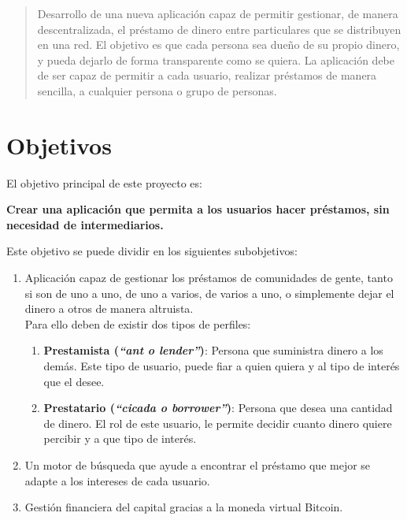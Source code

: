 \documentclass[10pt]{article}
\begin{document}
\title{}
\author{Diego Pardilla}
\date{\today}


\maketitle

\begin{abstract}
Desarrollo de una nueva aplicación capaz de permitir gestionar, de manera descentralizada, el préstamo de dinero entre particulares que se distribuyen en una red. El objetivo es que cada persona sea dueño de su propio dinero, y pueda dejarlo de forma transparente como se quiera. La aplicación debe de ser capaz de permitir a cada usuario, realizar préstamos de manera sencilla, a cualquier persona o grupo de personas.   
\end{abstract}

\section{Objetivos}

El objetivo principal de este proyecto es:

\begin{center}
\bf{Crear una aplicación que permita a los usuarios hacer préstamos, sin necesidad de intermediarios.}
\end{center}

Este objetivo se puede dividir en los siguientes subobjetivos:

\begin{enumerate}
  \item Aplicación capaz de gestionar los préstamos de comunidades de gente, tanto si son de uno a uno,  de uno a varios, de varios a uno, o simplemente dejar el dinero a otros de manera altruista.\\ 
Para ello deben de existir dos tipos de perfiles:
\begin{enumerate}
    \item \textbf{Prestamista (\textit{``ant o lender''})}: Persona que suministra dinero a los demás. Este tipo de usuario, puede fiar a quien quiera y al tipo de interés que el desee.
    \item \textbf{Prestatario (\textit{``cicada o borrower''})}: Persona que desea una cantidad de dinero. El rol de este usuario, le permite decidir cuanto dinero quiere percibir y a que tipo de interés.
\end{enumerate}
  \item Un motor de búsqueda que ayude a encontrar el préstamo que mejor se adapte a los intereses de cada usuario.
  \item Gestión financiera del capital gracias a la moneda virtual Bitcoin.
\end{enumerate}
\end{document}
